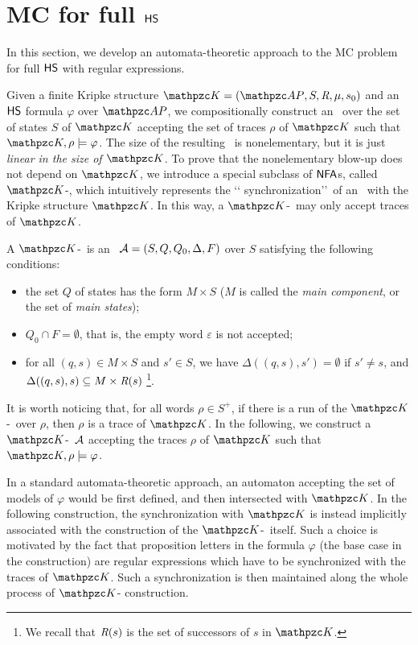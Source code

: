\section{MC for full $\text{\sffamily HS}$}\label{sect:fullHS}

In this section, we develop an automata-theoretic approach to the MC problem 
for full $\text{\sffamily HS}$ with regular expressions. 

Given a finite Kripke structure $\Ku=\KuDef$ and an $\text{\sffamily HS}$ formula $\varphi$ over 
$\Prop$, we compositionally construct an \NFA\ over the set of states $S$ of 
$\Ku$ accepting the set of traces $\rho$ of $\Ku$ such that 
$\Ku,\rho\models\varphi$. The size of the resulting \NFA\ is nonelementary, but 
it is just \emph{linear in the size of $\Ku$}. To prove that the nonelementary 
blow-up does not depend on $\Ku$, we introduce a special subclass of  $\text{\sffamily NFA}$s, 
called  $\Ku$-\NFA, which intuitively represents the \lq\lq 
synchronization\rq\rq\ of an \NFA\ with the  Kripke structure $\Ku$. In this 
way, a $\Ku$-\NFA\ may only accept traces of $\Ku$. 

\begin{definition}[$\Ku$-\NFA]
A $\Ku$-\NFA\   is an \NFA\ $\mathcal{A}=(S,Q,Q_0,\Delta,F)$ over $S$ satisfying the 
following conditions:
\begin{itemize}
  \item the set $Q$ of states has the form $M\times S$ ($M$ is called the 
  \emph{main component}, or the set of \emph{main states});
  \item $Q_0\cap F = \emptyset$, that is, the empty word $\varepsilon$ is not accepted;
  \item for all $(q,s)\in M\times S$ and $s'\in S$, we have 
  $\Delta((q,s),s')=\emptyset$ if $s' \neq s$,
and $\Delta((q,s),s)\subseteq M\times \textit{R}(s)$%
\footnote{We recall that $\textit{R}(s)$ is the set of successors of $s$ in $\Ku$.}.
\end{itemize}
\end{definition}
%
It is worth noticing that,
for all words $\rho\in S^{+}$, if there is a run of the $\Ku$-\NFA\ over $\rho$, then $\rho$ is a trace of  $\Ku$. In the following, we construct a $\Ku$-\NFA\ $\mathcal{A}$ accepting the traces $\rho$ of $\Ku$ such that $\Ku,\rho\models\varphi$. 

In a standard automata-theoretic approach, an automaton accepting the set of models of $\varphi$ would be first defined, and then intersected with $\Ku$. In the following construction, the synchronization with $\Ku$ is instead implicitly associated with the construction of the  $\Ku$-\NFA\ itself.
Such a choice is motivated by the fact that proposition letters in the formula $\varphi$ (the base case in the construction) are regular expressions which have to be synchronized with 
the traces of $\Ku$. Such a synchronization  is then maintained along the whole process of
$\Ku$-\NFA{} construction. 

